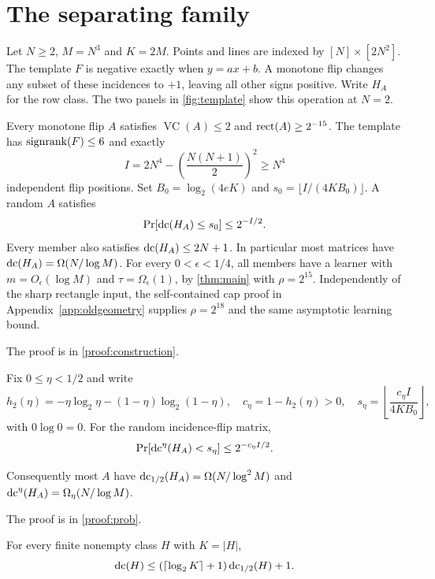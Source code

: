 \section{The separating family}\label{sec:family}
Let $N\ge2$, $M=N^3$ and $K=2M$. Points and lines are indexed by $[N]\times[2N^2]$. The template $F$ is negative exactly when $y=ax+b$. A monotone flip changes any subset of these incidences to $+1$, leaving all other signs positive. Write $H_A$ for the row class. The two panels in \cref{fig:template} show this operation at $N=2$.
\begin{theorem}\label{thm:construction}
Every monotone flip $A$ satisfies $\operatorname{VC}(A)\le2$ and $\operatorname{rect}(A)\ge2^{-15}$. The template has $\operatorname{signrank}(F)\le6$ and exactly
\begin{equation}\label{eq:I}
 I=2N^4-\left(\frac{N(N+1)}2\right)^2\ge N^4
\end{equation}
independent flip positions. Set $B_0=\log_2(4eK)$ and $s_0=\lfloor I/(4KB_0)\rfloor$. A random $A$ satisfies
\[
 \Pr[\operatorname{dc}(H_A)\le s_0]\le2^{-I/2}.
\]
Every member also satisfies $\operatorname{dc}(H_A)\le2N+1$. In particular most matrices have $\operatorname{dc}(H_A)=\Omega(N/\log M)$. For every $0<\epsilon<1/4$, all members have a learner with $m=O_\epsilon(\log M)$ and $\tau=\Omega_\epsilon(1)$, by \cref{thm:main} with $\rho=2^{15}$. Independently of the sharp rectangle input, the self-contained cap proof in Appendix~\ref{app:oldgeometry} supplies $\rho=2^{18}$ and the same asymptotic learning bound.
\end{theorem}
\noindent The proof is in \cref{proof:construction}.
\begin{theorem}\label{thm:prob}
Fix $0\le\eta<1/2$ and write
\[
 h_2(\eta)=-\eta\log_2\eta-(1-\eta)\log_2(1-\eta),\quad
 c_\eta=1-h_2(\eta)>0,
 \quad s_\eta=\left\lfloor\frac{c_\eta I}{4KB_0}\right\rfloor,
\]
with $0\log 0=0$. For the random incidence-flip matrix,
\begin{equation}\label{eq:approx-prob}
 \Pr[\operatorname{dc}^\eta(H_A)<s_\eta]\le2^{-c_\eta I/2}.
\end{equation}

Consequently most $A$ have $\operatorname{dc}_{1/2}(H_A)=\Omega(N/\log^2M)$ and $\operatorname{dc}^\eta(H_A)=\Omega_\eta(N/\log M)$.
\end{theorem}
\noindent The proof is in \cref{proof:prob}.
\begin{lemma}\label{lem:exact-prob}
For every finite nonempty class $H$ with $K=|H|$,
\begin{equation}\label{eq:exact-prob}
 \operatorname{dc}(H)\le(\lceil\log_2K\rceil+1)\operatorname{dc}_{1/2}(H)+1.
\end{equation}
\end{lemma}
